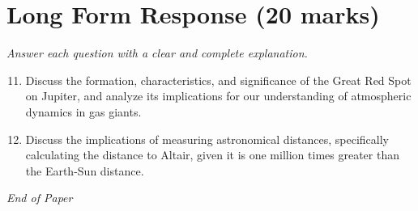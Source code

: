 \documentclass[12pt]{article}
\begin{document}
\section*{Long Form Response (20 marks)}
\textit{Answer each question with a clear and complete explanation.}
\begin{enumerate}[label=\arabic*.]
\setcounter{enumi}{10}
\item Discuss the formation, characteristics, and significance of the Great Red Spot on Jupiter, and analyze its implications for our understanding of atmospheric dynamics in gas giants.
\item Discuss the implications of measuring astronomical distances, specifically calculating the distance to Altair, given it is one million times greater than the Earth-Sun distance.
\end{enumerate}

\vfill
\noindent\textit{End of Paper}
\end{document}
